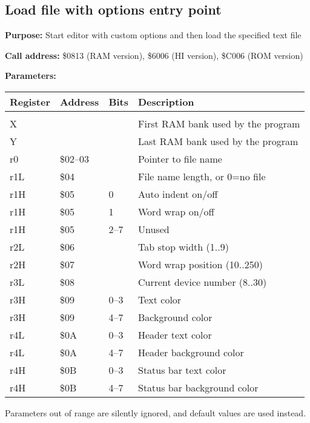 \documentclass{article}
\begin{document}
    \subsection{Load file with options entry point}

        \textbf{Purpose:} Start editor with custom options and then load the specified text file

        \textbf{Call address:} \$0813 (RAM version), \$6006 (HI version), \$C006 (ROM version)

        \textbf{Parameters:}

        \begin{longtable}[l]{l l l l}
	        \textbf{Register} & \textbf{Address} & \textbf{Bits} & \textbf{Description} \\
	        \hline \\
            X   &          &      & First RAM bank used by the program \\
            Y   &          &      & Last RAM bank used by the program \\
            r0  & \$02--03 &      & Pointer to file name \\
            r1L & \$04     &      & File name length, or 0=no file \\
            r1H & \$05     & 0    & Auto indent on/off \\
            r1H & \$05     & 1    & Word wrap on/off \\
            r1H & \$05     & 2--7 & Unused \\
            r2L & \$06     &      & Tab stop width (1..9) \\
            r2H & \$07     &      & Word wrap position (10..250) \\
            r3L & \$08     &      & Current device number (8..30) \\
            r3H & \$09     & 0--3 & Text color \\
            r3H & \$09     & 4--7 & Background color \\
            r4L & \$0A     & 0--3 & Header text color \\
            r4L & \$0A     & 4--7 & Header background color \\
            r4H & \$0B     & 0--3 & Status bar text color \\
            r4H & \$0B     & 4--7 & Status bar background color \\
        \end{longtable}

        Parameters out of range are silently ignored, and default
        values are used instead.
\end{document}
